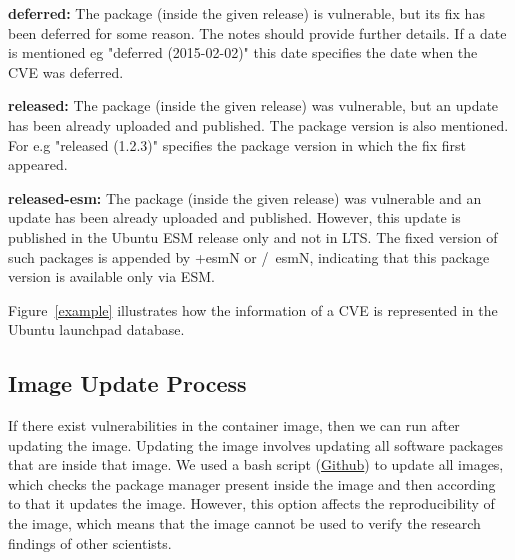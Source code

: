 \documentclass[a4paper,num-refs]{oup-contemporary}
\begin{document}
\textbf{deferred:} The package (inside the given release) is vulnerable, but 
                   its fix has been deferred for some reason. The notes
		   should provide further details. If a date is mentioned eg
		   "deferred (2015-02-02)" this date specifies the date when
		   the CVE was deferred.

\textbf{released:} The package (inside the given release) was vulnerable, but
		an update has been already uploaded and published. The package version
		is also mentioned. For e.g "released (1.2.3)"
		specifies the package version in which the fix first appeared.

\textbf{released-esm:} The package (inside the given release) was vulnerable and
		an update has been already uploaded and published. However,
		this update is published in the Ubuntu ESM release only and not in LTS.
		The fixed version of such packages is appended by
		+esmN or /~esmN, indicating that this package version is available
		only via ESM.

Figure~\ref{example} illustrates how the information of a CVE is represented
in the Ubuntu launchpad database.

\subsection{Image Update Process}

If there exist vulnerabilities in the container image, then we can
run after updating the
image. Updating the image involves updating all software packages that are
inside that image. We used a bash script (\href{https://github.com/kaurbhupinder/Vulnerability-Analysis}{Github}) 
to update all images, which checks the
package manager present inside the image and then according to that it
updates the image. However, this option affects the reproducibility
of the image, which means that the image cannot be used to verify the research
findings of other scientists.
\end{document}
